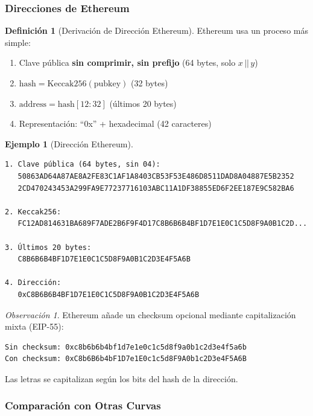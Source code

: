 \documentclass[11pt,a4paper,twoside,openright]{book}
\theoremstyle{definition}
\newtheorem{definition}{Definición}[chapter]
\newtheorem{example}{Ejemplo}[chapter]
\theoremstyle{plain}
\theoremstyle{remark}
\newtheorem{remark}{Observación}[chapter]
\begin{document}
\subsubsection{Direcciones de Ethereum}

\begin{definition}[Derivación de Dirección Ethereum]
Ethereum usa un proceso más simple:
\begin{enumerate}
    \item Clave pública \textbf{sin comprimir, sin prefijo} (64 bytes, solo $x \,||\, y$)
    \item $\text{hash} = \text{Keccak256}(\text{pubkey})$ (32 bytes)
    \item $\text{address} = \text{hash}[12:32]$ (últimos 20 bytes)
    \item Representación: ``0x'' + hexadecimal (42 caracteres)
\end{enumerate}
\end{definition}

\begin{example}[Dirección Ethereum]
\begin{verbatim}
1. Clave pública (64 bytes, sin 04):
   50863AD64A87AE8A2FE83C1AF1A8403CB53F53E486D8511DAD8A04887E5B2352
   2CD470243453A299FA9E77237716103ABC11A1DF38855ED6F2EE187E9C582BA6

2. Keccak256:
   FC12AD814631BA689F7ADE2B6F9F4D17C8B6B6B4BF1D7E1E0C1C5D8F9A0B1C2D...

3. Últimos 20 bytes:
   C8B6B6B4BF1D7E1E0C1C5D8F9A0B1C2D3E4F5A6B

4. Dirección:
   0xC8B6B6B4BF1D7E1E0C1C5D8F9A0B1C2D3E4F5A6B
\end{verbatim}
\end{example}

\begin{remark}
Ethereum añade un checksum opcional mediante capitalización mixta (EIP-55):
\begin{verbatim}
Sin checksum: 0xc8b6b6b4bf1d7e1e0c1c5d8f9a0b1c2d3e4f5a6b
Con checksum: 0xC8b6B6b4bF1D7e1E0c1c5d8F9A0b1c2D3e4F5A6B
\end{verbatim}

Las letras se capitalizan según los bits del hash de la dirección.
\end{remark}

\subsubsection{Comparación con Otras Curvas}
\end{document}
